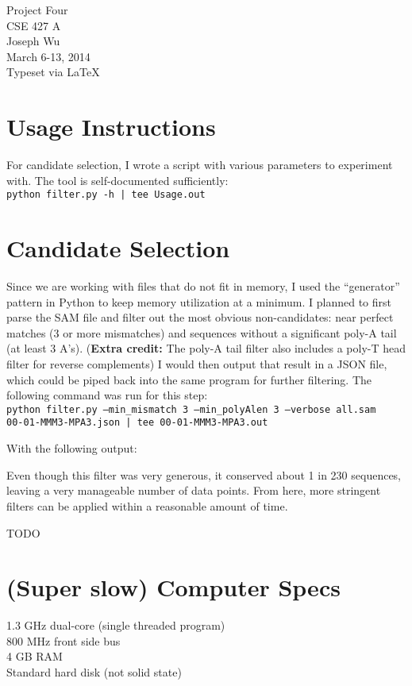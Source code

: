 \documentclass[a4paper, 12pt]{report}
\begin{document}
    \begin{center}
        {\LARGE Project Four} \\
        CSE 427 A \\
        Joseph Wu  \\
        March 6-13, 2014 \\
        {\tiny Typeset via \LaTeX}
    \end{center}
    
\section{Usage Instructions}
    For candidate selection, I wrote a script with various parameters to experiment with.  
    The tool is self-documented sufficiently: \\
    \texttt{python filter.py -h | tee Usage.out}
    
    
\section{Candidate Selection}
    Since we are working with files that do not fit in memory, 
        I used the ``generator'' pattern in Python to keep memory utilization at a minimum.
    I planned to first parse the SAM file and filter out the most obvious non-candidates:
        near perfect matches (3 or more mismatches) 
        and sequences without a significant poly-A tail (at least 3 A's). 
    (\textbf{Extra credit:} The poly-A tail filter also includes a poly-T head filter for reverse complements)
    I would then output that result in a JSON file, 
        which could be piped back into the same program for further filtering.
    The following command was run for this step: \\
    \texttt{python filter.py --min\_mismatch 3 --min\_polyAlen 3 --verbose all.sam \\
            00-01-MMM3-MPA3.json | tee 00-01-MMM3-MPA3.out}
    
    With the following output:
    
    
    Even though this filter was very generous, it conserved about 1 in 230 sequences, 
        leaving a very manageable number of data points.  
    From here, more stringent filters can be applied within a reasonable amount of time. 
    
    TODO

\section{(Super slow) Computer Specs}
    1.3 GHz dual-core (single threaded program) \\
    800 MHz front side bus \\
    4 GB RAM \\
    Standard hard disk (not solid state)
\end{document}
